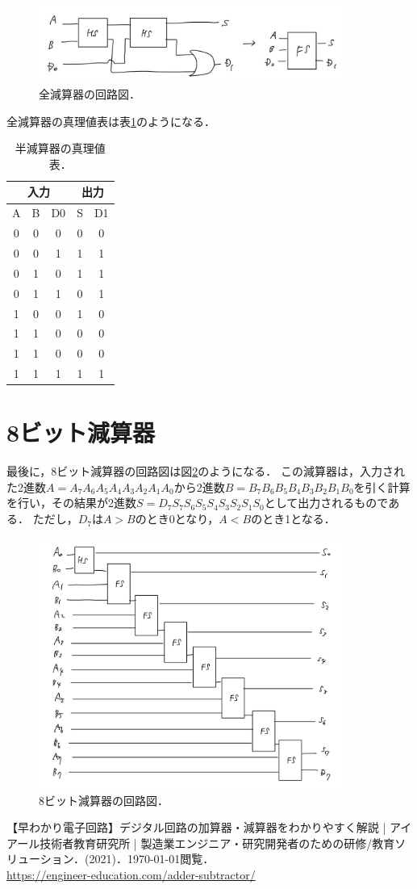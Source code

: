 \documentclass[a4paper,11pt]{jsarticle}
\begin{document}
\begin{figure}[htbp]
  \centering
  \includegraphics[width=10cm]{FS.jpg}
  \caption{全減算器の回路図．}
  \label{fig:FS}
\end{figure}

全減算器の真理値表は表\ref{tab:FS}のようになる．
\begin{table}[htbp]
  \centering
  \caption{半減算器の真理値表．}
  \label{tab:FS}
  \begin{tabular}{ccc|cc}
    \hline
    \multicolumn{3}{c|}{入力} & \multicolumn{2}{c}{出力} \\
    \hline
    A & B & D0 & S & D1 \\
    \hline\hline
    0 & 0 & 0 & 0 & 0 \\
    0 & 0 & 1 & 1 & 1 \\
    0 & 1 & 0 & 1 & 1 \\
    0 & 1 & 1 & 0 & 1 \\
    1 & 0 & 0 & 1 & 0 \\
    1 & 1 & 0 & 0 & 0 \\
    1 & 1 & 0 & 0 & 0 \\
    1 & 1 & 1 & 1 & 1 \\
    \hline
  \end{tabular}
\end{table}


\section{8ビット減算器}
最後に，8ビット減算器の回路図は図\ref{fig:8bit}のようになる．
この減算器は，入力された2進数$A=A_7A_6A_5A_4A_3A_2A_1A_0$から2進数$B=B_7B_6B_5B_4B_3B_2B_1B_0$を引く計算を行い，その結果が2進数$S=D_7S_7S_6S_5S_4S_3S_2S_1S_0$として出力されるものである．
ただし，$D_7$は$A>B$のとき0となり，$A<B$のとき1となる．

\begin{figure}[htbp]
  \centering
  \includegraphics[width=10cm]{8bit.jpg}
  \caption{8ビット減算器の回路図．}
  \label{fig:8bit}
\end{figure}

\begin{thebibliography}{99}
   【早わかり電子回路】デジタル回路の加算器・減算器をわかりやすく解説 | アイアール技術者教育研究所 | 製造業エンジニア・研究開発者のための研修/教育ソリューション．(2021)．\today 閲覧．\\
  \url{https://engineer-education.com/adder-subtractor/}
\end{thebibliography}
\end{document}
